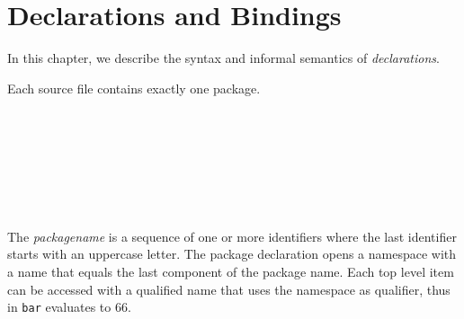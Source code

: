 

\chapter{Declarations and Bindings} \label{declarations}
  

In this chapter, we describe the syntax and informal semantics of \frege{} \emph{declarations}.

Each source file contains exactly one package.

\begin{flushleft}
    \bracea{}  \bracez{} \\
 
  \alt {}  
  \alt {}  \\
 
  \alt {} \sym{;} \\
  
  \alt {}        
  \alt {}          
  \alt {}          
  \alt {}         
  \alt {}          
  \alt {}        
  \alt {}\\
     
  \alt  {}          
  \alt  {}        \\
 \\

\end{flushleft}

The \emph{packagename} is a sequence of one or more identifiers where the last identifier starts with an uppercase letter.
The package declaration opens a namespace with a name that equals the last component of the package name.
Each top level item can be accessed with a qualified name that uses the namespace as qualifier, thus in
\texttt{bar} evaluates to 66.

